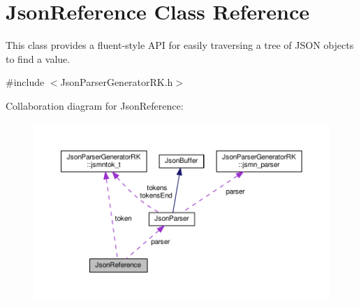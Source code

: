 \hypertarget{class_json_reference}{}\section{Json\+Reference Class Reference}
\label{class_json_reference}


This class provides a fluent-\/style A\+PI for easily traversing a tree of J\+S\+ON objects to find a value.  




{\ttfamily \#include $<$Json\+Parser\+Generator\+R\+K.\+h$>$}



Collaboration diagram for Json\+Reference\+:
\nopagebreak
\begin{figure}[H]
\begin{center}
\leavevmode
\includegraphics[width=350pt]{class_json_reference__coll__graph}
\end{center}
\end{figure}
